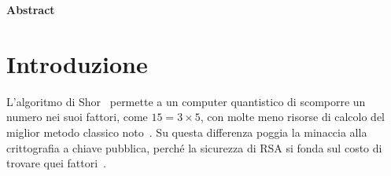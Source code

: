 %
%
%

\clearpage
\thispagestyle{empty}
{}
\vspace*{\fill}
\begin{center}
    {\Huge\bfseries Abstract}
\end{center}
\vspace*{\fill}
\clearpage

\renewcommand{\theequation}{\arabic{equation}}
\renewcommand{\thetable}{\arabic{table}}
\let\abstractACL\addcontentsline
\renewcommand{\addcontentsline}[3]{}

\begingroup
\setlength{\parindent}{0pt}
\setlength{\parskip}{4pt plus 0.5pt minus 0.5pt}

\section*{Introduzione}

L'algoritmo di Shor~\cite{shor1994} permette a un computer quantistico di
scomporre un numero nei suoi fattori, come $15=3\times5$, con molte meno risorse
di calcolo del miglior metodo classico noto~\cite{lenstra1993gnfs}.
Su questa differenza poggia la minaccia alla crittografia a chiave pubblica,
perché la sicurezza di RSA si fonda sul costo di trovare quei
fattori~\cite{rsa1978}.

